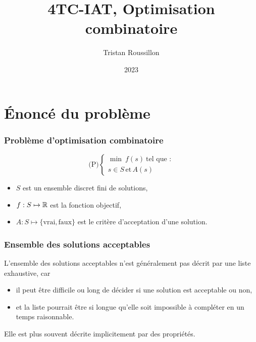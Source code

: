 \documentclass{beamer}
\title[]
 {4TC-IAT, Optimisation combinatoire}
\author[T. Roussillon]
 {Tristan Roussillon}
\date{2023}
\institute{INSA Lyon, TC}
\newcommand{\R}{{\ensuremath\mathbb{R}}}
\begin{document}
\begin{frame}
  \titlepage
\end{frame}

\section{\'Enoncé du problème}

\begin{frame}
  \frametitle{Problème d'optimisation combinatoire}

  \[
  \text{(P)} \left\{
  \begin{array}{c}
    \min \ f(s) \ \text{tel que :} \\
    s \in S \, \text{et} \, A(s)
  \end{array}
  \right.
  \]

  \begin{itemize}
  \item $S$ est un ensemble discret fini de solutions,
  \item $f : S \mapsto \R$ est la fonction objectif,
  \item $A : S \mapsto \{\text{vrai},\text{faux}\}$ est le critère d'acceptation d'une solution. 
  \end{itemize}
\end{frame}

\begin{frame}
  \frametitle{Ensemble des solutions acceptables}

  L'ensemble des solutions acceptables n'est généralement pas décrit par une liste exhaustive, car

  \begin{itemize}
  \item il peut être difficile ou long de décider si une solution est acceptable ou non,
  \item et la liste pourrait être si longue qu'elle soit impossible à compléter en un temps raisonnable. 
  \end{itemize}
  
  Elle est plus souvent décrite implicitement par des propriétés.  

\end{frame}
\end{document}
